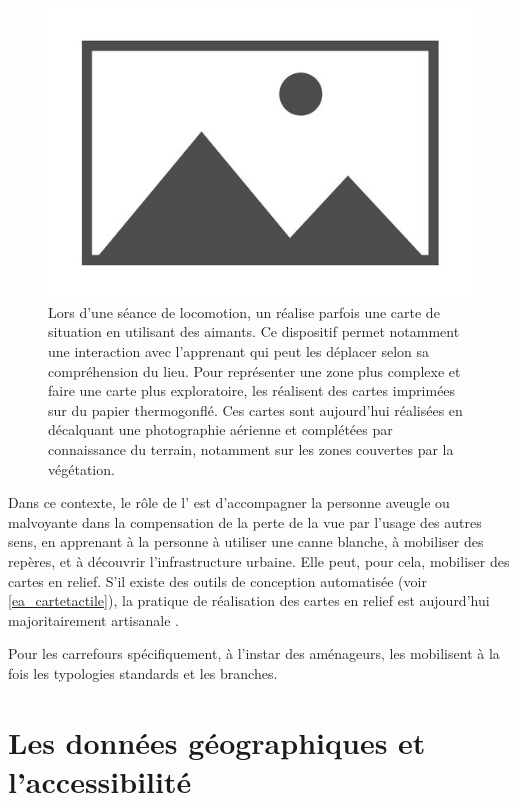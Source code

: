 \begin{figure}
    \centering
    \includegraphics{images/placeholder.jpg}
    \caption{Lors d'une séance de locomotion, un \ipa{} réalise parfois une carte de situation en utilisant des aimants. Ce dispositif permet notamment une interaction avec l'apprenant qui peut les déplacer selon sa compréhension du lieu. Pour représenter une zone plus complexe et faire une carte plus exploratoire, les \ipas{} réalisent des cartes imprimées sur du papier thermogonflé. Ces cartes sont aujourd'hui réalisées en décalquant une photographie aérienne et complétées par connaissance du terrain, notamment sur les zones couvertes par la végétation.}
    \label{fig:il_carte}
\end{figure}

Dans ce contexte, le rôle de l'\ipa{} est d'accompagner la personne aveugle ou malvoyante dans la compensation de la perte de la vue par l'usage des autres sens, en apprenant à la personne à utiliser une canne blanche, à mobiliser des repères, et à découvrir l'infrastructure urbaine. Elle peut, pour cela, mobiliser des cartes en relief. S'il existe des outils de conception automatisée (voir \ref{ea_cartetactile}), la pratique de réalisation des cartes en relief est aujourd'hui majoritairement artisanale .

Pour les carrefours spécifiquement, à l'instar des aménageurs, les \ipas{} mobilisent à la fois les typologies standards et les branches. \todo{}

\section{Les données géographiques et l'accessibilité}

